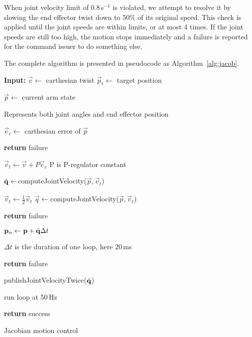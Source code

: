 \documentclass[buriama8_dp.tex]{subfiles}
\begin{document}
When joint velocity limit of 0.8\,s\(^{-1}\) is violated, we attempt to resolve it by slowing the end effector twist down to 50\% of its original speed. This check is applied until the joint speeds are within limits, or at most 4 times. If the joint speeds are still too high, the motion stops immediately and a failure is reported for the command issuer to do something else.

The complete algorithm is presented in pseudocode as Algorithm~\ref{alg:jacob}.

\begin{algorithm}[htp]
\begin{algorithmic}
  \State \textbf{Input:}
  \State \(\vec v \gets\) carthesian twist
  \State \(\vec p_t \gets\) target position
  \vspace{1em}

    \State \(\vec p \gets \) current arm state
    \Comment \parbox[t]{.4\textwidth}{Represents both joint angles and end effector position}
    \State \(\vec e_c \gets \) carthesian error of \(\vec p\)
    
      \State \textbf{return} failure
    \EndIf

    \State \(\vec v_t \gets \vec v + P \vec e_c\)
    \Comment \m P is P-regulator constant

    \State \(\dot{\mathbf{q}} \gets \)computeJointVelocity(\(\vec p, \vec v_t\))
    \vspace{1em}

      \State \(\vec v_t \gets \frac{1}{2} \vec v_t\)
      \State \(\dot{\vec q} \gets \)computeJointVelocity(\(\vec p, \vec v_t\))
    \EndWhile

      \State \textbf{return} failure
    \EndIf
    \vspace{1em}

    \State \(\mathbf{p}_n \gets \mathbf{p} + \dot{\mathbf{q}} \Delta t\)
    \Comment \parbox[t]{.4\textwidth}{\(\Delta t\) is the duration of one loop, here 20\,ms}

      \State \textbf{return} failure
    \EndIf
    \vspace{1em}

    \State publishJointVelocityTwice(\(\dot{\mathbf{q}}\))

    \State run loop at 50\,Hz
    
  \EndWhile
  \State \textbf{return} success
\end{algorithmic}
\caption{Jacobian motion control}
\label{alg:jacob}
\end{algorithm}
\end{document}
